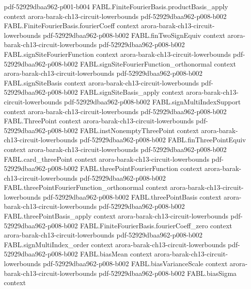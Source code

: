 \begin{theorem}
  {pdf-52929dbaa962-p001-b004}
\proofstep
  {FABL.FiniteFourierBasis.productBasis_apply}
  {context}
  {arora-barak-ch13-circuit-lowerbounds}
  {pdf-52929dbaa962-p008-b002}
\proofstep
  {FABL.FiniteFourierBasis.fourierCoeff}
  {context}
  {arora-barak-ch13-circuit-lowerbounds}
  {pdf-52929dbaa962-p008-b002}
\proofstep
  {FABL.finTwoSignEquiv}
  {context}
  {arora-barak-ch13-circuit-lowerbounds}
  {pdf-52929dbaa962-p008-b002}
\proofstep
  {FABL.signSiteFourierFunction}
  {context}
  {arora-barak-ch13-circuit-lowerbounds}
  {pdf-52929dbaa962-p008-b002}
\proofstep
  {FABL.signSiteFourierFunction_orthonormal}
  {context}
  {arora-barak-ch13-circuit-lowerbounds}
  {pdf-52929dbaa962-p008-b002}
\proofstep
  {FABL.signSiteBasis}
  {context}
  {arora-barak-ch13-circuit-lowerbounds}
  {pdf-52929dbaa962-p008-b002}
\proofstep
  {FABL.signSiteBasis_apply}
  {context}
  {arora-barak-ch13-circuit-lowerbounds}
  {pdf-52929dbaa962-p008-b002}
\proofstep
  {FABL.signMultiIndexSupport}
  {context}
  {arora-barak-ch13-circuit-lowerbounds}
  {pdf-52929dbaa962-p008-b002}
\proofstep
  {FABL.ThreePoint}
  {context}
  {arora-barak-ch13-circuit-lowerbounds}
  {pdf-52929dbaa962-p008-b002}
\proofstep
  {FABL.instNonemptyThreePoint}
  {context}
  {arora-barak-ch13-circuit-lowerbounds}
  {pdf-52929dbaa962-p008-b002}
\proofstep
  {FABL.finThreePointEquiv}
  {context}
  {arora-barak-ch13-circuit-lowerbounds}
  {pdf-52929dbaa962-p008-b002}
\proofstep
  {FABL.card_threePoint}
  {context}
  {arora-barak-ch13-circuit-lowerbounds}
  {pdf-52929dbaa962-p008-b002}
\proofstep
  {FABL.threePointFourierFunction}
  {context}
  {arora-barak-ch13-circuit-lowerbounds}
  {pdf-52929dbaa962-p008-b002}
\proofstep
  {FABL.threePointFourierFunction_orthonormal}
  {context}
  {arora-barak-ch13-circuit-lowerbounds}
  {pdf-52929dbaa962-p008-b002}
\proofstep
  {FABL.threePointBasis}
  {context}
  {arora-barak-ch13-circuit-lowerbounds}
  {pdf-52929dbaa962-p008-b002}
\proofstep
  {FABL.threePointBasis_apply}
  {context}
  {arora-barak-ch13-circuit-lowerbounds}
  {pdf-52929dbaa962-p008-b002}
\proofstep
  {FABL.FiniteFourierBasis.fourierCoeff_zero}
  {context}
  {arora-barak-ch13-circuit-lowerbounds}
  {pdf-52929dbaa962-p008-b002}
\proofstep
  {FABL.signMultiIndex_order}
  {context}
  {arora-barak-ch13-circuit-lowerbounds}
  {pdf-52929dbaa962-p008-b002}
\proofstep
  {FABL.biasMean}
  {context}
  {arora-barak-ch13-circuit-lowerbounds}
  {pdf-52929dbaa962-p008-b002}
\proofstep
  {FABL.biasVarianceScale}
  {context}
  {arora-barak-ch13-circuit-lowerbounds}
  {pdf-52929dbaa962-p008-b002}
\proofstep
  {FABL.biasSigma}
  {context}

\end{theorem}
